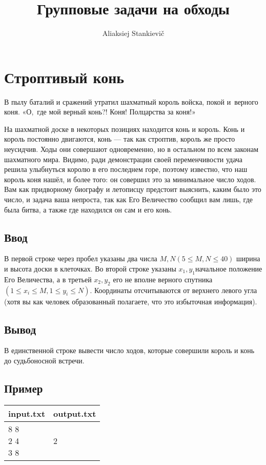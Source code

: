 \documentclass[12pt, oneside]{article}
\author{Aliaksiej Stankievič}
\title{Групповые задачи на обходы}
\begin{document}
\section{Строптивый конь}

В пылу баталий и сражений утратил шахматный король войска, покой 
и\textellipsis ~верного коня. «О,~где мой верный конь?! Коня! Полцарства за коня!»

На шахматной доске в некоторых позициях находится конь и король. Конь и король постоянно 
двигаются, конь --- так как строптив, король же просто  неусидчив. Ходы они совершают 
одновременно, но в остальном по всем законам шахматного мира. Видимо, ради 
демонстрации своей переменчивости удача решила улыбнуться королю в его последнем горе, 
поэтому известно, что наш король коня нашёл, и более того: он совершил это за минимальное 
число ходов. Вам как придворному биографу и летописцу предстоит выяснить, каким было это 
число, и задача ваша непроста, так как Его Величество сообщил вам лишь, где была битва, 
а также где находился он сам и его конь.

\subsection*{Ввод}

В первой строке через пробел указаны два числа $ M, N (5\leq{}M, N\leq40) $ ширина и 
высота доски в клеточках. Во второй строке указаны $ x_{1}, y_{1} $начальное положение 
Его Величества, а в третьей $ x_{2}, y_{2} $ его не вполне верного 
спутника $ (1\leq{}x_{i}\leq{}M,1\leq{}y_{i}\leq{}N) $.  Координаты отсчитываются от 
верхнего левого угла (хотя вы как человек образованный полагаете, что это избыточная информация).

\subsection*{Вывод}

В единственной строке вывести число ходов, которые совершили король и конь до судьбоносной встречи.

\subsection*{Пример}

\begin{tabular}{|p{}|p{}|}
\hline
input.txt &output.txt \\\hline
\makecell[tl]{8 8\\2 4 \\3 8}
&2\\\hline
\end{tabular}
\end{document}
